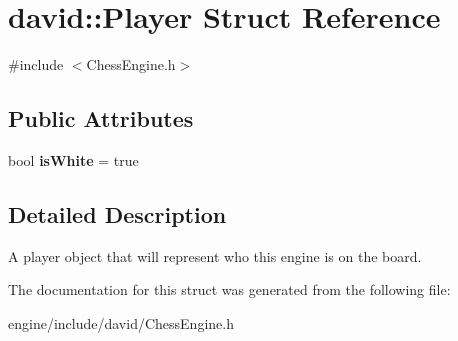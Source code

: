 \hypertarget{structdavid_1_1Player}{}\section{david\+:\+:Player Struct Reference}
\label{structdavid_1_1Player}


{\ttfamily \#include $<$Chess\+Engine.\+h$>$}

\subsection*{Public Attributes}
\begin{DoxyCompactItemize}
\item 
\mbox{\label{structdavid_1_1Player_ad1b0c5285287d4be02e019885ae81c82}} 
bool {\bfseries is\+White} = true
\end{DoxyCompactItemize}


\subsection{Detailed Description}
A player object that will represent who this engine is on the board. 

The documentation for this struct was generated from the following file\+:\begin{DoxyCompactItemize}
\item 
engine/include/david/Chess\+Engine.\+h\end{DoxyCompactItemize}
